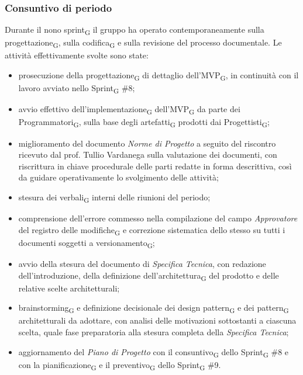﻿\documentclass[a4paper, 10pt, colorlinks=true, linkcolor=black, urlcolor=blue, citecolor=blue, hidelinks]{article}
\begin{document}
\subsubsection{Consuntivo di periodo}
Durante il nono sprint\textsubscript{G} il gruppo ha operato contemporaneamente sulla progettazione\textsubscript{G}, sulla codifica\textsubscript{G} e sulla revisione del processo documentale. Le attività effettivamente svolte sono state:
\begin{itemize}
    \item prosecuzione della progettazione\textsubscript{G} di dettaglio dell'MVP\textsubscript{G}, in continuità con il lavoro avviato nello Sprint\textsubscript{G} \#8;

    \item avvio effettivo dell'implementazione\textsubscript{G} dell'MVP\textsubscript{G} da parte dei Programmatori\textsubscript{G}, sulla base degli artefatti\textsubscript{G} prodotti dai Progettisti\textsubscript{G};

    \item miglioramento del documento \textit{Norme di Progetto} a seguito del riscontro ricevuto dal prof. Tullio Vardanega sulla valutazione dei documenti, con riscrittura in chiave procedurale delle parti redatte in forma descrittiva, così da guidare operativamente lo svolgimento delle attività;

    \item stesura dei verbali\textsubscript{G} interni delle riunioni del periodo;

    \item comprensione dell'errore commesso nella compilazione del campo \textit{Approvatore} del registro delle modifiche\textsubscript{G} e correzione sistematica dello stesso su tutti i documenti soggetti a versionamento\textsubscript{G};

    \item avvio della stesura del documento di \textit{Specifica Tecnica}, con redazione dell'introduzione, della definizione dell'architettura\textsubscript{G} del prodotto e delle relative scelte architetturali;

    \item brainstorming\textsubscript{G} e definizione decisionale dei design pattern\textsubscript{G} e dei pattern\textsubscript{G} architetturali da adottare, con analisi delle motivazioni sottostanti a ciascuna scelta, quale fase preparatoria alla stesura completa della \textit{Specifica Tecnica};

    \item aggiornamento del \textit{Piano di Progetto} con il consuntivo\textsubscript{G} dello Sprint\textsubscript{G} \#8 e con la pianificazione\textsubscript{G} e il preventivo\textsubscript{G} dello Sprint\textsubscript{G} \#9.
\end{itemize}
\end{document}
